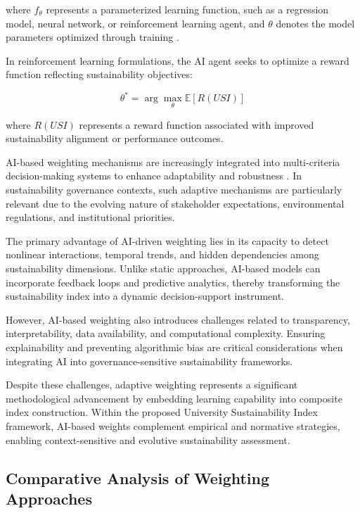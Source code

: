 \documentclass[11pt,a4paper]{article}
\begin{document}
where $f_{\theta}$ represents a parameterized learning function, such as a regression model, neural network, or reinforcement learning agent, and $\theta$ denotes the model parameters optimized through training \cite{Goodfellow2016,Jordan2015}.

In reinforcement learning formulations, the AI agent seeks to optimize a reward function reflecting sustainability objectives:

\begin{equation}
\theta^{*} = \arg\max_{\theta} \mathbb{E}[R(USI)]
\end{equation}

where $R(USI)$ represents a reward function associated with improved sustainability alignment or performance outcomes.

AI-based weighting mechanisms are increasingly integrated into multi-criteria decision-making systems to enhance adaptability and robustness \cite{HerreraViedma2007,Zavadskas2011}. In sustainability governance contexts, such adaptive mechanisms are particularly relevant due to the evolving nature of stakeholder expectations, environmental regulations, and institutional priorities.

The primary advantage of AI-driven weighting lies in its capacity to detect nonlinear interactions, temporal trends, and hidden dependencies among sustainability dimensions. Unlike static approaches, AI-based models can incorporate feedback loops and predictive analytics, thereby transforming the sustainability index into a dynamic decision-support instrument.

However, AI-based weighting also introduces challenges related to transparency, interpretability, data availability, and computational complexity. Ensuring explainability and preventing algorithmic bias are critical considerations when integrating AI into governance-sensitive sustainability frameworks.

Despite these challenges, adaptive weighting represents a significant methodological advancement by embedding learning capability into composite index construction. Within the proposed University Sustainability Index framework, AI-based weights complement empirical and normative strategies, enabling context-sensitive and evolutive sustainability assessment.
\subsection{Comparative Analysis of Weighting Approaches}
\end{document}
